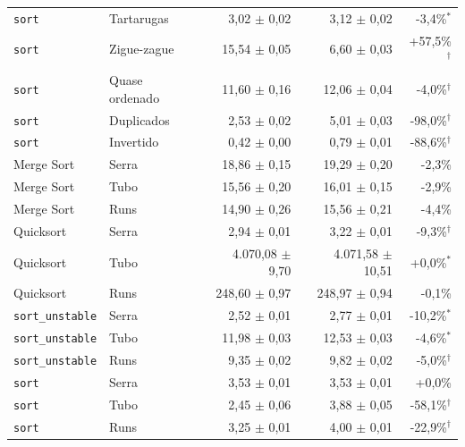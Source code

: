 \begin{tabular}{llrrr}
\texttt{sort} & Tartarugas & 3,02 $\pm$ 0,02 & 3,12 $\pm$ 0,02 & -3,4\%$^{*}$ \\
\texttt{sort} & Zigue-zague & 15,54 $\pm$ 0,05 & 6,60 $\pm$ 0,03 & +57,5\%$^{\dagger}$ \\
\texttt{sort} & Quase ordenado & 11,60 $\pm$ 0,16 & 12,06 $\pm$ 0,04 & -4,0\%$^{\dagger}$ \\
\texttt{sort} & Duplicados & 2,53 $\pm$ 0,02 & 5,01 $\pm$ 0,03 & -98,0\%$^{\dagger}$ \\
\texttt{sort} & Invertido & 0,42 $\pm$ 0,00 & 0,79 $\pm$ 0,01 & -88,6\%$^{\dagger}$ \\
\hline
Merge Sort & Serra & 18,86 $\pm$ 0,15 & 19,29 $\pm$ 0,20 & -2,3\% \\
Merge Sort & Tubo & 15,56 $\pm$ 0,20 & 16,01 $\pm$ 0,15 & -2,9\% \\
Merge Sort & Runs & 14,90 $\pm$ 0,26 & 15,56 $\pm$ 0,21 & -4,4\% \\
Quicksort & Serra & 2,94 $\pm$ 0,01 & 3,22 $\pm$ 0,01 & -9,3\%$^{\dagger}$ \\
Quicksort & Tubo & 4.070,08 $\pm$ 9,70 & 4.071,58 $\pm$ 10,51 & +0,0\%$^{*}$ \\
Quicksort & Runs & 248,60 $\pm$ 0,97 & 248,97 $\pm$ 0,94 & -0,1\% \\
\texttt{sort\_unstable} & Serra & 2,52 $\pm$ 0,01 & 2,77 $\pm$ 0,01 & -10,2\%$^{*}$ \\
\texttt{sort\_unstable} & Tubo & 11,98 $\pm$ 0,03 & 12,53 $\pm$ 0,03 & -4,6\%$^{*}$ \\
\texttt{sort\_unstable} & Runs & 9,35 $\pm$ 0,02 & 9,82 $\pm$ 0,02 & -5,0\%$^{\dagger}$ \\
\texttt{sort} & Serra & 3,53 $\pm$ 0,01 & 3,53 $\pm$ 0,01 & +0,0\% \\
\texttt{sort} & Tubo & 2,45 $\pm$ 0,06 & 3,88 $\pm$ 0,05 & -58,1\%$^{\dagger}$ \\
\texttt{sort} & Runs & 3,25 $\pm$ 0,01 & 4,00 $\pm$ 0,01 & -22,9\%$^{\dagger}$ \\
\hline
\end{tabular}
